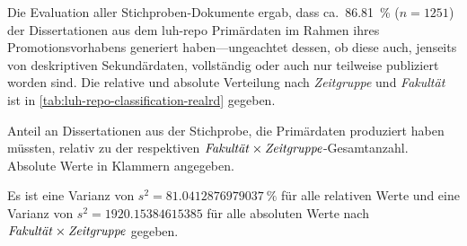 Die Evaluation aller Stichproben-Dokumente ergab, dass ca.~\SI{86,81}{\percent} ($n=\num{1251}$) der Dissertationen aus dem \gls{luh-repo} Primärdaten im Rahmen ihres Promotionsvorhabens generiert haben---ungeachtet dessen, ob diese auch, jenseits von deskriptiven Sekundärdaten, vollständig oder auch nur teilweise publiziert worden sind.
Die relative und absolute Verteilung nach \textit{Zeitgruppe} und \textit{Fakultät} ist in \cref{tab:luh-repo-classification-realrd} gegeben.
\begin{table}[!htbp]
	\caption{Anteil an Dissertationen aus der Stichprobe, die Primärdaten produziert haben müssten, relativ zu der respektiven $\text{\textit{Fakultät}}\times\text{\textit{Zeitgruppe}}$-Gesamtanzahl.
    Absolute Werte in Klammern angegeben.}
    
    \label{tab:luh-repo-classification-realrd}
\end{table}
Es ist eine Varianz von $s^2=\SI[round-mode=places,round-precision=3]{81.0412876979037}{\percent}$ für alle relativen Werte und eine Varianz von $s^2=\num[round-mode=places,round-precision=3]{1920.15384615385}$ für alle absoluten Werte nach $\text{\textit{Fakultät}}\times\text{\textit{Zeitgruppe}}$ gegeben.


